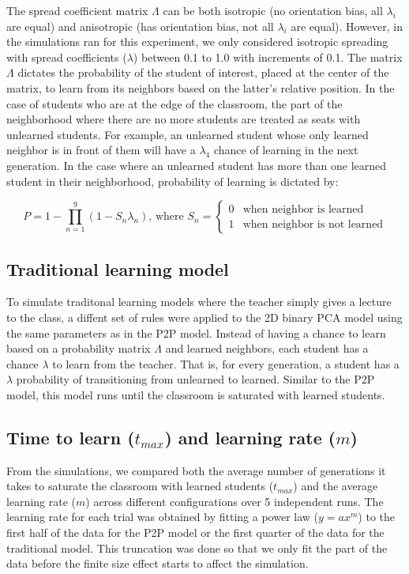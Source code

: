 \documentclass[10pt,a4paper,twoside]{article}
\begin{document}
\noindent The spread coefficient matrix $\Lambda$ can be both isotropic (no orientation bias, all $\lambda_i$ are equal) and anisotropic (has orientation bias, not all $\lambda_i$ are equal). However, in the simulations ran for this experiment, we only considered isotropic spreading with spread coefficients ($\lambda$) between 0.1 to 1.0 with increments of 0.1. The matrix $\Lambda$ dictates the probability of the student of interest, placed at the center of the matrix, to learn from its neighbors based on the latter's relative position. In the case of students who are at the edge of the classroom, the part of the neighborhood where there are no more students are treated as seats with unlearned students. For example, an unlearned student whose only learned neighbor is in front of them will have a $\lambda_4$ chance of learning in the next generation. In the case where an unlearned student has more than one learned student in their neighborhood, probability of learning is dictated by:

\begin{equation}
  P = 1 - \prod_{n=1}^{9}{(1-S_n\lambda_n)}
  \text{, where } S_n=
  \begin{cases}
    0 & \text{when neighbor is learned}\\
    1 & \text{when neighbor is not learned}
  \end{cases}
  \label{eq:learning probability}
\end{equation}

\subsection{Traditional learning model}
To simulate traditonal learning models where the teacher simply gives a lecture to the class, a diffent set of rules were applied to the 2D binary PCA model using the same parameters as in the P2P model. Instead of having a chance to learn based on a probability matrix $\Lambda$ and learned neighbors, each student has a chance $\lambda$ to learn from the teacher. That is, for every generation, a student has a $\lambda$ probability of transitioning from unlearned to learned. Similar to the P2P model, this model runs until the classroom is saturated with learned students.

\subsection{Time to learn ($t_{max}$) and learning rate ($m$)}
From the simulations, we compared both the average number of generations it takes to saturate the classroom with learned students ($t_{max}$) and the average learning rate ($m$) across different configurations over 5 independent runs. The learning rate for each trial was obtained by fitting a power law ($y = ax^m$) to the first half of the data for the P2P model or the first quarter of the data for the traditional model. This truncation was done so that we only fit the part of the data before the finite size effect starts to affect the simulation. %
\end{document}
